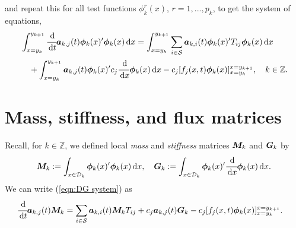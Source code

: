 and repeat this for all test functions \(\phi^r_k(x)\), \(r=1,...,p_k\), to get the system of equations,
\begin{align}
	\begin{multlined}[t]\int_{x=y_k}^{y_{k+1}}\cfrac{\wrt}{\wrt t} \boldsymbol a_{k,j}(t) \boldsymbol \phi_k(x)\tr{}\boldsymbol \phi_k(x)\wrt x = \int_{x=y_k}^{y_{k+1}}\sum_{i\in\calS} \boldsymbol a_{k,i}(t) \boldsymbol \phi_k(x)\tr{}T_{ij}\boldsymbol\phi_k (x)\wrt x  
	\\{}+  \int_{x=y_k}^{y_{k+1}}\boldsymbol a_{k,j}(t) \boldsymbol \phi_k(x)\tr{}c_j\cfrac{\wrt}{\wrt x}\boldsymbol\phi_k(x)\wrt x - c_j[f_j(x,t) \boldsymbol\phi_k(x)]_{x=y_k}^{x=y_{k+1}},\quad k\in\mathbb Z. \end{multlined} \label{eqn:DG system}
\end{align}

\section{Mass, stiffness, and flux matrices}
Recall, for \(k\in\mathbb Z\), we defined local \textit{mass} and \textit{stiffness} matrices \(\boldsymbol M_k\) and \(\boldsymbol G_k\) by 
\[\boldsymbol M_k := \int_{x\in\mathcal{D}_k}\boldsymbol \phi_k(x)'{}\boldsymbol \phi_k(x)\, \mathrm{d} x,\quad \boldsymbol G_k := \int_{x\in\mathcal{D}_k}\boldsymbol \phi_k(x)'{}\cfrac{\, \mathrm{d}}{\, \mathrm{d} x} \boldsymbol \phi_k(x)\, \mathrm{d} x.\]
We can write (\ref{eqn:DG system}) as 
\begin{align}
	&\cfrac{\, \mathrm{d}}{\, \mathrm{d} t} \boldsymbol a_{k,j}(t) \boldsymbol M_k = \sum_{i\in\mathcal{S}} \boldsymbol a_{k,i}(t)\boldsymbol M_kT_{ij} 
	+  c_j\boldsymbol a_{k,j}(t) \boldsymbol G_k - c_j[f_j(x,t)\boldsymbol\phi_k(x)]_{x=y_k}^{x=y_{k+1}}.\label{eqn:DG matrix}
\end{align}

